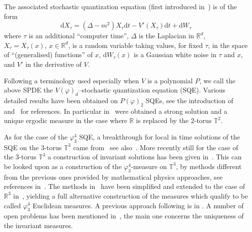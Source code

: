 \documentclass[a4paper,10pt]{article}
\newcommand{\mathd}{\mathrm{d}}
\begin{document}
The associated stochastic quantization equation (first introduced
in~{\cite{parisi_perturbation_1981}}) is of the form
\[ \mathd X_{\tau} = (\Delta - m^2) X_{\tau} \mathd t - V' (X_{\tau}) \mathd
   t + \mathd W_{\tau} \]
where $\tau$ is an additional ``computer time'', $\Delta$ is the Laplacian in
$\mathbb{R}^d$, $X_{\tau} = X_{\tau} (x)$, $x \in \mathbb{R}^d$, is a random
variable taking values, for fixed $\tau$, in the space of ``(generalised)
functions'' of $x$, $\mathd W_{\tau} (x)$ is a Gaussian white noise in $\tau$
and $x$, and $V'$ in the derivative of $V$.

Following a terminology used especially when $V$ is a polynomial $P$, we call
the above SPDE the $V (\varphi)_d$--stochastic quantization equation (SQE).
Various detailed results have been obtained on $P (\varphi)_2$ SQEs, see the
introduction of~{\cite{albeverio_invariant_2017}}
and~{\cite{gubinelli_pde_2018,GH18}} for references. In particular
in~{\cite{da_prato_strong_2003}} were obtained a strong solution and a unique
ergodic measure in the case where $\mathbb{R}$ is replaced by the $2$-torus
$\mathbb{T}^2$.

As for the case of the $\varphi^4_3$ SQE, a breakthrough for local in time
solutions of the SQE on the $3$-torus $\mathbb{T}^3$ came
from~{\cite{Hairer2014}} see also~{\cite{CaCh,GuImPe}}. More recently still
for the case of the $3$-torus $\mathbb{T}^3$ a construction of invariant
solutions has been given in~{\cite{albeverio_invariant_2017}}. This can be
looked upon as a construction of the $\varphi^4_3$-measure on $\mathbb{T}^3$,
by methods different from the previous ones provided by mathematical physics
approaches, see references in~{\cite{Glimm1987}}. The methods
in~{\cite{albeverio_invariant_2017}} have been simplified and extended to the
case of $\mathbb{R}^3$ in~{\cite{gubinelli_pde_2018}}, yielding a full
alternative construction of the measures which qualify to be called
$\varphi^4_3$ Euclidean measures. A previous approach following
{\cite{Hairer2014}} is in {\cite{MoWe}}. A number of open problems has been
mentioned in~{\cite{albeverio_invariant_2017,gubinelli_pde_2018}}, the main
one concerns the uniqueness of the invariant measures.
\end{document}
